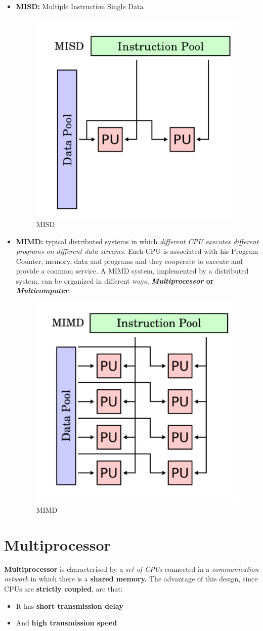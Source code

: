 \begin{itemize}
    \item \textbf{MISD:} Multiple Instruction Single Data
    \begin{figure}[htp]
            \centering
            \includegraphics[width=.30\linewidth]{images/distributedSystem/MISD.jpeg}
            \caption{MISD}
        \end{figure}
    
    \item \textbf{MIMD:} typical distributed systems in which \textit{ different CPU executes different programs on different data streams.} Each CPU is associated with his Program Counter, memory, data and programs and they cooperate to execute and provide a common service.
    A MIMD system, implemented by a distributed system, can be organized in different ways, \textbf{\textit{Multiprocessor} or \textit{Multicomputer}}.
    \begin{figure}[htp]
            \centering
            \includegraphics[width=.30\linewidth]{images/distributedSystem/MIMD.jpeg}
            \caption{MIMD}
    \end{figure}
    
\end{itemize}

\newpage
\section{Multiprocessor}
\textbf{Multiprocessor} is characterised by a \textit{set of CPUs} connected in a \textit{communication network} in which there is a \textbf{shared memory.} The advantage of this design, since CPUs are \textbf{strictly coupled}, are that:
\begin{itemize}
    \item It has \textbf{short transmission delay}
    \item And \textbf{high transmission speed}
\end{itemize}

